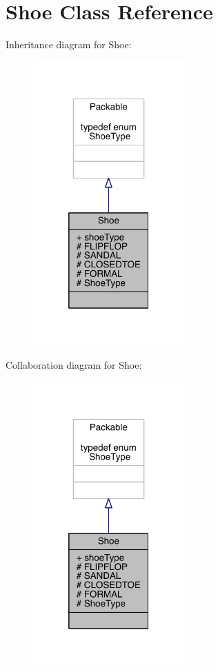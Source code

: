 \hypertarget{interface_shoe}{\section{Shoe Class Reference}
\label{interface_shoe}
}


Inheritance diagram for Shoe\-:\nopagebreak
\begin{figure}[H]
\begin{center}
\leavevmode
\includegraphics[width=164pt]{interface_shoe__inherit__graph}
\end{center}
\end{figure}


Collaboration diagram for Shoe\-:\nopagebreak
\begin{figure}[H]
\begin{center}
\leavevmode
\includegraphics[width=164pt]{interface_shoe__coll__graph}
\end{center}
\end{figure}
